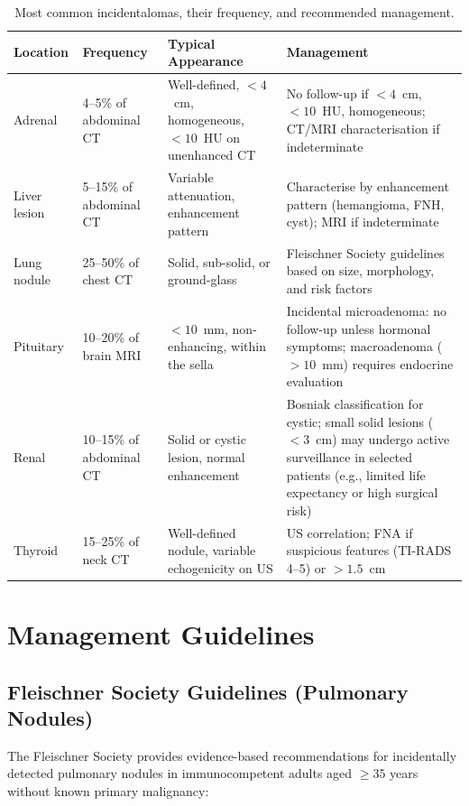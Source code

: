 \begin{table}[h]
\centering
\caption{Most common incidentalomas, their frequency, and recommended management.}
\label{tab:incidentalomas}
\begin{tabular}{p{2.5cm} p{2.5cm} p{3.5cm} p{5cm}}
\toprule
\textbf{Location} & \textbf{Frequency} & \textbf{Typical Appearance} & \textbf{Management} \\
\midrule
Adrenal & 4--5\% of abdominal CT & Well-defined, $<4$~cm, homogeneous, $<10$~HU on unenhanced CT & No follow-up if $<4$~cm, $<10$~HU, homogeneous; CT/MRI characterisation if indeterminate \\
Liver lesion & 5--15\% of abdominal CT & Variable attenuation, enhancement pattern & Characterise by enhancement pattern (hemangioma, FNH, cyst); MRI if indeterminate \\
Lung nodule & 25--50\% of chest CT & Solid, sub-solid, or ground-glass & Fleischner Society guidelines based on size, morphology, and risk factors \\
Pituitary & 10--20\% of brain MRI & $<10$~mm, non-enhancing, within the sella & Incidental microadenoma: no follow-up unless hormonal symptoms; macroadenoma ($>10$~mm) requires endocrine evaluation \\
Renal & 10--15\% of abdominal CT & Solid or cystic lesion, normal enhancement & Bosniak classification for cystic; small solid lesions ($<3$~cm) may undergo active surveillance in selected patients (e.g., limited life expectancy or high surgical risk) \\
Thyroid & 15--25\% of neck CT & Well-defined nodule, variable echogenicity on US & US correlation; FNA if suspicious features (TI-RADS 4--5) or $>1.5$~cm \\
\bottomrule
\end{tabular}
\end{table}

\section{Management Guidelines}

\subsection{Fleischner Society Guidelines (Pulmonary Nodules)}
The Fleischner Society provides evidence-based recommendations for incidentally detected pulmonary nodules in immunocompetent adults aged $\geq 35$ years without known primary malignancy:

